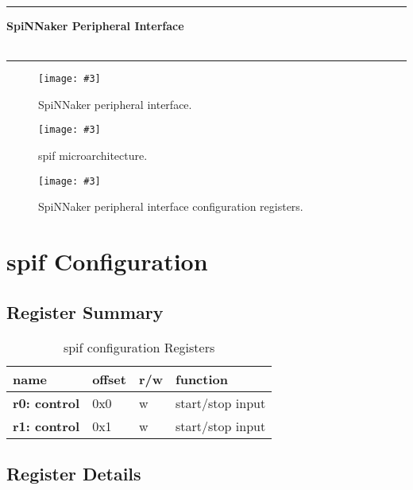 \documentclass[11pt,a4paper,twoside]{article}
\newcommand{\image}[5][]
{
\begin{figure}[#2]
   \begin{center}
      \texttt{[image: \#3]}
      \caption{#5}
      \label{fig:#4}
   \end{center}
\end{figure}
}
\begin{document}
\rule{\linewidth}{2pt}

\begin{center}
	\textbf{
		\Large{SpiNNaker Peripheral Interface} \\
		\vspace*{0.5cm}
		\large {\myversion} \\
		\large{\mydate}
	}
\end{center}

\rule{\linewidth}{2pt}

\vspace*{1.0cm}


\image[width = \textwidth]{!h}{spin_per_if}{fig:spin_if}
	{SpiNNaker peripheral interface.}


\image[width = \textwidth]{!h}{spif_bd}{fig:spif_bd}
{spif microarchitecture.}


\image[width = 0.9 \textwidth]{!h}{spif_cf}{fig:spif_cf}
{SpiNNaker peripheral interface configuration registers.}


\section{spif Configuration}


\subsection{Register Summary}


\begin{table}[!ht]
	\caption{spif configuration Registers}
	\begin{center}
		\renewcommand{\arraystretch}{1.2}
		\begin{tabularx}{\textwidth}{| p{\ncw} p{\ocw} p{\rcw} X |}
			\hline
			\textbf{name}        & \textbf{offset} & \textbf{r/w} & \textbf{function} \\%
			\hline
			\hline
			\textbf{r0: control} & 0x0             & w            & start/stop input  \\%
			\textbf{r1: control} & 0x1             & w            & start/stop input  \\%
			\hline
		\end{tabularx}
	\end{center}
	\label{tab:resources}
\end{table}


\subsection{Register Details}
\end{document}
